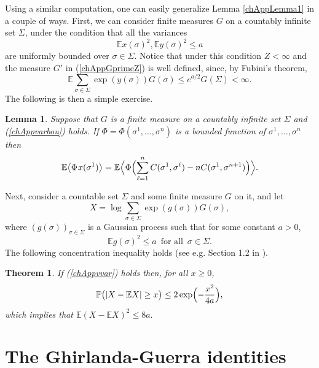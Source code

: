 \documentclass[12pt]{article}
\newcommand{\smsp}{\hspace{0.3mm}}
\newcommand{\e}{\mathbb{E}}
\newcommand{\p}{\mathbb{P}}
\newcommand{\la}{\langle}
\newcommand{\ra}{\rangle}
\newtheorem{lemma}{Lemma}
\newtheorem{theorem}{Theorem}
\theoremstyle{nonumberplain}
\begin{document}
\medskip
\noindent
Using a similar computation, one can easily generalize Lemma \ref{chAppLemma1} in a couple of ways. First, we can consider finite measures $G$ on a countably infinite set $\Sigma$, under the condition that all the variances 
\begin{equation}
\e x(\sigma)^2, \e y(\sigma)^2 \leq a 
\label{chAppvarbou}
\end{equation}
are uniformly bounded over $\sigma\in\Sigma$. Notice that under this condition $Z<\infty$ and the measure $G'$ in (\ref{chAppGprimeZ}) is well defined, since, by Fubini's theorem,
$$
\e \sum_{\sigma\in\Sigma} \exp(y(\sigma))G(\sigma) 
\leq
e^{a/2}G(\Sigma) <\infty.
$$
The following is then a simple exercise.
\begin{lemma}\label{chAppLemma2}
Suppose that $G$ is a finite measure on a countably infinite set $\Sigma$ and (\ref{chAppvarbou}) holds. If $\Phi = \Phi(\sigma^1,\ldots, \sigma^n)$ is a bounded function of $\sigma^1,\ldots, \sigma^n$  then 
\begin{equation}
\e\bigl\la \Phi \smsp x(\sigma^1) \bigr\ra 
= 
\e \Bigl\la 
\Phi
\Bigl(
\sum_{\ell=1}^n C(\sigma^1,\sigma^{\ell}) - n C(\sigma^1,\sigma^{n+1})
\Bigr)
\Big\ra.
\label{chAppLemExa}
\end{equation}
\end{lemma}
Next, consider a countable set $\Sigma$ and some finite measure $G$ on it, and let
\begin{equation}
X=\log \sum_{\sigma\in\Sigma} \exp(g(\sigma)) G(\sigma),
\label{chAppXFE}
\end{equation}
where $(g(\sigma))_{\sigma\in\Sigma}$ is a Gaussian process such that for some constant $a>0$, 
\begin{equation}
\e g(\sigma)^2 \leq a
\,\mbox{ for all }\,
\sigma\in \Sigma.
\label{chAppvvar}
\end{equation}
The following concentration inequality holds (see e.g. Section 1.2 in \cite{SKmodel}).
\begin{theorem}\label{chAppLextra4}
If (\ref{chAppvvar}) holds then, for all $x\geq 0$,
\begin{equation}
\p\bigl( |X-\e X|\geq x\bigr)\leq 2\exp\Bigl(- \frac{x^2}{4a}\Bigr),
\label{chAppGCieq}
\end{equation}
which implies that $\e(X-\e X)^2 \leq 8 a.$
\end{theorem}


\section{The Ghirlanda-Guerra identities}
\end{document}
